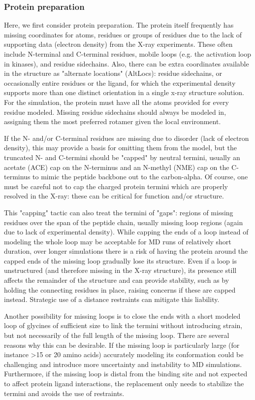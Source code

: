 \documentclass[9pt,bestpractices]{livecoms}
\begin{document}
\subsubsection{Protein preparation}

Here, we first consider protein preparation. The protein itself frequently has missing coordinates for atoms, residues or groups of residues due to the lack of supporting data (electron density) from the X-ray experiments. These often include N-terminal and C-terminal residues, mobile loops (e.g. the activation loop in kinases), and residue sidechains. Also, there can be extra coordinates available in the structure as "alternate locations" (AltLocs): residue sidechains, or occasionally entire residues or the ligand, for which the experimental density supports more than one distinct orientation in a single x-ray structure solution. For the simulation, the protein must have all the atoms provided for every residue modeled. Missing residue sidechains should always be modeled in, assigning them the most preferred rotamer given the local environment. 

If the N- and/or C-terminal residues are missing due to disorder (lack of electron density), this may provide a basis for omitting them from the model, but the truncated N- and C-termini should be "capped" by neutral termini, usually an acetate (ACE) cap on the N-terminus and an N-methyl (NME) cap on the C-terminus to mimic the peptide backbone out to the carbon-alpha. Of course, one must be careful not to cap the charged protein termini which are properly resolved in the X-ray: these can be critical for function and/or structure. 

This "capping" tactic can also treat the termini of "gaps": regions of missing residues over the span of the peptide chain, usually missing loop regions (again due to lack of experimental density). While capping the ends of a loop instead of modeling the whole loop may be acceptable for MD runs of relatively short duration, over longer simulations there is a risk of having the protein around the capped ends of the missing loop gradually lose its structure. Even if a loop is unstructured (and therefore missing in the X-ray structure), its presence still affects the remainder of the structure and can provide stability, such as by holding the connecting residues in place, raising concerns if these are capped instead. Strategic use of a distance restraints can mitigate this liability.

Another possibility for missing loops is to close the ends with a short modeled loop of glycines of sufficient size to link the termini without introducing strain, but not necessarily of the full length of the missing loop. There are several reasons why this can be desirable. If the missing loop is particularly large (for instance >15 or 20 amino acids) accurately modeling its conformation could be challenging and introduce more uncertainty and instability to MD simulations. Furthermore, if the missing loop is distal from the binding site and not expected to affect protein ligand interactions, the replacement only needs to stabilize the termini and avoids the use of restraints. 
\end{document}
